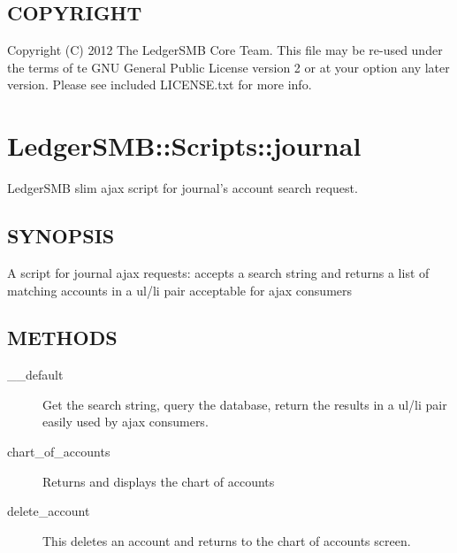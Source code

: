 \begin{description}
\begin{description}
\end{description}
\subsection*{COPYRIGHT\label{LedgerSMB::Scripts::report_aging_COPYRIGHT}}


Copyright (C) 2012 The LedgerSMB Core Team.  This file may be re-used under the
terms of te GNU General Public License version 2 or at your option any later
version.  Please see included LICENSE.txt for more info.

\section{LedgerSMB::Scripts::journal\label{LedgerSMB::Scripts::journal}}


LedgerSMB slim ajax script for journal's
account search request.

\subsection*{SYNOPSIS\label{LedgerSMB::Scripts::journal_SYNOPSIS}}


A script for journal ajax requests: accepts a search string and returns a
list of matching accounts in a ul/li pair acceptable for ajax consumers

\subsection*{METHODS\label{LedgerSMB::Scripts::journal_METHODS}}
\begin{description}

\item[{\_\_default}] \mbox{}

Get the search string, query the database, return the results in a ul/li
pair easily used by ajax consumers.


\item[{chart\_of\_accounts}] \mbox{}

Returns and displays the chart of accounts


\item[{delete\_account}] \mbox{}

This deletes an account and returns to the chart of accounts screen.




\end{description}
\end{description}
